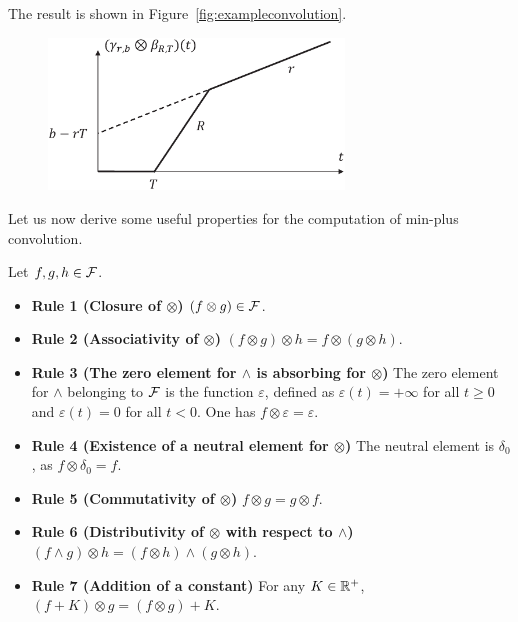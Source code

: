 The result is shown in Figure~\ref{fig:exampleconvolution}.
\begin{figure}[!htbp]
    \includegraphics[width=0.7\textwidth,keepaspectratio]{ec.eps}
\end{figure}
Let us now derive some useful properties for the computation of min-plus convolution.
\begin{theorem}
Let $f, g, h \in \mathcal F$.
\begin{itemize}
\item{\textbf{Rule 1 (Closure of $\otimes$)}
$(f \otimes g) \in \mathcal F$.}
\item{\textbf{Rule 2 (Associativity of $\otimes$)}
$(f \otimes g) \otimes h =  f \otimes (g \otimes h)$.}
\item{ \textbf{Rule 3 (The zero element for $\wedge$ is absorbing for $\otimes$)}
The zero element for $\wedge$ belonging to $\mathcal F$ is the function $\varepsilon$, defined as
$\varepsilon(t) = +\infty$ for all $t \geq 0$ and $\varepsilon(t) = 0$ for all $t < 0$.
One has $f \otimes \varepsilon = \varepsilon$.}
\item{ \textbf{Rule 4 (Existence of a neutral element for $\otimes$)}
The neutral element is $\delta_0$, as $f \otimes \delta_0 = f$.}
\item{ \textbf{Rule 5 (Commutativity of $\otimes$)} $f \otimes g = g \otimes f$.}
\item{ \textbf{Rule 6 (Distributivity of $\otimes$ with respect to $\wedge$)}
$(f \wedge g) \otimes h =  (f \otimes h) \wedge (g \otimes h)$. }
\item{ \textbf{Rule 7 (Addition of a constant)} For any $K \in \mathbb{R}^{+}$,
$(f + K) \otimes g =  (f \otimes g) + K$. }
\end{itemize}
\end{theorem}
